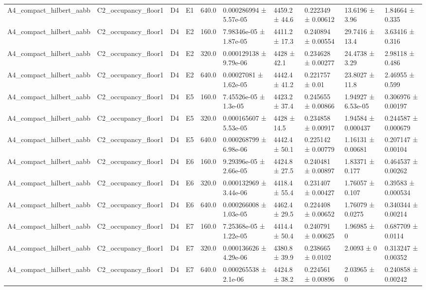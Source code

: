 \begin{table}
\begin{tabular}{llllllllll}
A4\_compact\_hilbert\_aabb & C2\_occupancy\_floor1 & D4 & E1 & 640.0 & 0.000286994 ± 5.57e-05 & 4459.2 ± 44.6 & 0.222349 ± 0.00612 & 13.6196 ± 3.96 & 1.84664 ± 0.335 \\
A4\_compact\_hilbert\_aabb & C2\_occupancy\_floor1 & D4 & E2 & 160.0 & 7.98346e-05 ± 1.87e-05 & 4411.2 ± 17.3 & 0.240894 ± 0.00554 & 29.7416 ± 13.4 & 3.63416 ± 0.316 \\
A4\_compact\_hilbert\_aabb & C2\_occupancy\_floor1 & D4 & E2 & 320.0 & 0.000129138 ± 9.79e-06 & 4428 ± 42.1 & 0.234628 ± 0.00277 & 24.4738 ± 3.29 & 2.98118 ± 0.486 \\
A4\_compact\_hilbert\_aabb & C2\_occupancy\_floor1 & D4 & E2 & 640.0 & 0.00027081 ± 1.62e-05 & 4442.4 ± 41.2 & 0.221757 ± 0.01 & 23.8027 ± 11.8 & 2.46955 ± 0.599 \\
A4\_compact\_hilbert\_aabb & C2\_occupancy\_floor1 & D4 & E5 & 160.0 & 7.45526e-05 ± 1.3e-05 & 4423.2 ± 37.4 & 0.245655 ± 0.00866 & 1.94927 ± 6.53e-05 & 0.306976 ± 0.00197 \\
A4\_compact\_hilbert\_aabb & C2\_occupancy\_floor1 & D4 & E5 & 320.0 & 0.000165607 ± 5.53e-05 & 4428 ± 14.5 & 0.234858 ± 0.00917 & 1.94584 ± 0.000437 & 0.244587 ± 0.000679 \\
A4\_compact\_hilbert\_aabb & C2\_occupancy\_floor1 & D4 & E5 & 640.0 & 0.000268799 ± 6.98e-06 & 4442.4 ± 50.1 & 0.225142 ± 0.00779 & 1.16131 ± 0.00681 & 0.207147 ± 0.00104 \\
A4\_compact\_hilbert\_aabb & C2\_occupancy\_floor1 & D4 & E6 & 160.0 & 9.29396e-05 ± 2.66e-05 & 4424.8 ± 27.5 & 0.240481 ± 0.00897 & 1.83371 ± 0.177 & 0.464537 ± 0.00262 \\
A4\_compact\_hilbert\_aabb & C2\_occupancy\_floor1 & D4 & E6 & 320.0 & 0.000132969 ± 3.44e-06 & 4418.4 ± 55.4 & 0.231407 ± 0.00427 & 1.76057 ± 0.107 & 0.39583 ± 0.000534 \\
A4\_compact\_hilbert\_aabb & C2\_occupancy\_floor1 & D4 & E6 & 640.0 & 0.000266008 ± 1.03e-05 & 4462.4 ± 29.5 & 0.224408 ± 0.00652 & 1.76079 ± 0.0275 & 0.340344 ± 0.00214 \\
A4\_compact\_hilbert\_aabb & C2\_occupancy\_floor1 & D4 & E7 & 160.0 & 7.25368e-05 ± 1.22e-05 & 4414.4 ± 50.4 & 0.240791 ± 0.00625 & 1.96985 ± 0 & 0.687709 ± 0.0114 \\
A4\_compact\_hilbert\_aabb & C2\_occupancy\_floor1 & D4 & E7 & 320.0 & 0.000136626 ± 4.29e-06 & 4380.8 ± 39.9 & 0.238665 ± 0.0102 & 2.0093 ± 0 & 0.313247 ± 0.00352 \\
A4\_compact\_hilbert\_aabb & C2\_occupancy\_floor1 & D4 & E7 & 640.0 & 0.000265538 ± 2.1e-06 & 4424.8 ± 38.2 & 0.224561 ± 0.00896 & 2.03965 ± 0 & 0.240858 ± 0.00242 \\

\end{tabular}
\end{table}
